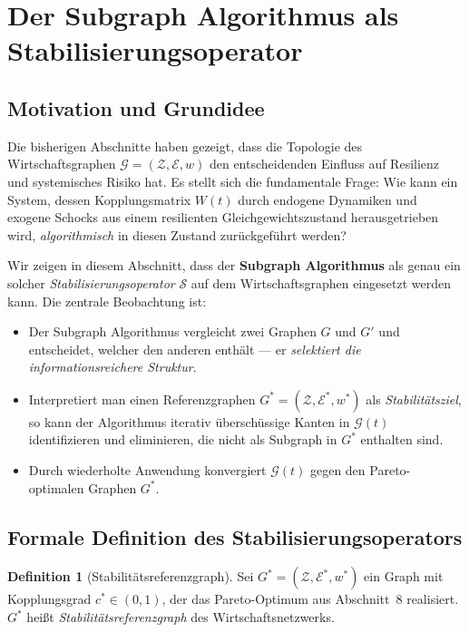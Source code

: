 ﻿\documentclass[a4paper,12pt]{article}
\theoremstyle{definition}
\newtheorem{definition}{Definition}
\begin{document}
\section{Der Subgraph Algorithmus als Stabilisierungsoperator}
\label{sec:stabop}

\subsection{Motivation und Grundidee}

Die bisherigen Abschnitte haben gezeigt, dass die Topologie des Wirtschaftsgraphen
$\mathcal{G} = (\mathcal{Z}, \mathcal{E}, w)$ den entscheidenden Einfluss auf
Resilienz und systemisches Risiko hat. Es stellt sich die fundamentale Frage: Wie kann
ein System, dessen Kopplungsmatrix $W(t)$ durch endogene Dynamiken und exogene Schocks
aus einem resilienten Gleichgewichtszustand herausgetrieben wird, \emph{algorithmisch}
in diesen Zustand zurückgeführt werden?

Wir zeigen in diesem Abschnitt, dass der \textbf{Subgraph Algorithmus} \citep{epp2026subgraph}
als genau ein solcher \emph{Stabilisierungsoperator} $\mathcal{S}$ auf dem Wirtschaftsgraphen
eingesetzt werden kann. Die zentrale Beobachtung ist:

\begin{itemize}
    \item Der Subgraph Algorithmus vergleicht zwei Graphen $G$ und $G'$ und entscheidet,
          welcher den anderen enthält --- er \emph{selektiert die informationsreichere Struktur}.
    \item Interpretiert man einen Referenzgraphen $G^* = (\mathcal{Z}, \mathcal{E}^*, w^*)$
          als \emph{Stabilitätsziel}, so kann der Algorithmus iterativ überschüssige Kanten
          in $\mathcal{G}(t)$ identifizieren und eliminieren, die nicht als Subgraph in $G^*$
          enthalten sind.
    \item Durch wiederholte Anwendung konvergiert $\mathcal{G}(t)$ gegen den
          Pareto-optimalen Graphen $G^*$.
\end{itemize}

\subsection{Formale Definition des Stabilisierungsoperators}

\begin{definition}[Stabilitätsreferenzgraph]
\label{def:refgraph}
    Sei $G^* = (\mathcal{Z}, \mathcal{E}^*, w^*)$ ein Graph mit Kopplungsgrad
    $c^* \in (0,1)$, der das Pareto-Optimum aus Abschnitt~8 realisiert. $G^*$
    heißt \emph{Stabilitätsreferenzgraph} des Wirtschaftsnetzwerks.
\end{definition}
\end{document}
